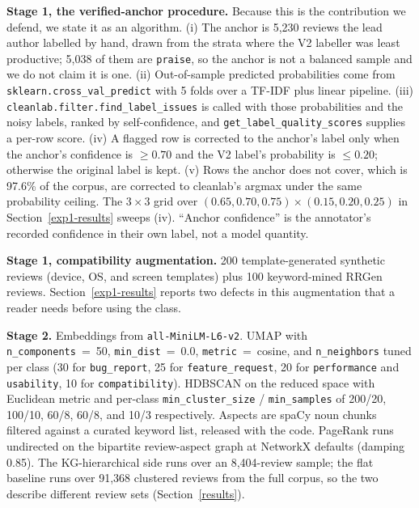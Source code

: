 \documentclass[preprint,12pt]{elsarticle}
\begin{document}
  \textbf{Stage 1, the verified-anchor procedure.} Because this is the contribution we defend, we
  state it as an algorithm. (i) The anchor is 5{,}230 reviews the lead author labelled by hand,
  drawn from the strata where the V2 labeller was least productive; 5{,}038 of them are
  \texttt{praise}, so the anchor is not a balanced sample and we do not claim it is one. (ii)
  Out-of-sample predicted probabilities come from \texttt{sklearn.cross\_val\_predict} with
  5 folds over a TF-IDF plus linear pipeline. (iii) \texttt{cleanlab.filter.find\_label\_issues}
  is called with those probabilities and the noisy labels, ranked by self-confidence, and
  \texttt{get\_label\_quality\_scores} supplies a per-row score. (iv) A flagged row is corrected to
  the anchor's label only when the anchor's confidence is $\geq 0.70$ and the V2 label's
  probability is $\leq 0.20$; otherwise the original label is kept. (v) Rows the anchor does not
  cover, which is 97.6\% of the corpus, are corrected to cleanlab's argmax under the same
  probability ceiling. The $3\times3$ grid over $(0.65, 0.70, 0.75) \times (0.15, 0.20, 0.25)$ in
  Section~\ref{exp1-results} sweeps (iv). ``Anchor confidence'' is the annotator's recorded
  confidence in their own label, not a model quantity.

  \textbf{Stage 1, compatibility augmentation.} 200 template-generated synthetic reviews (device,
  OS, and screen templates) plus 100 keyword-mined RRGen reviews. Section~\ref{exp1-results}
  reports two defects in this augmentation that a reader needs before using the class.

  \textbf{Stage 2.} Embeddings from \texttt{all-MiniLM-L6-v2}. UMAP with
  \texttt{n\_components}~=~50, \texttt{min\_dist}~=~0.0, \texttt{metric}~=~cosine, and
  \texttt{n\_neighbors} tuned per class (30 for \texttt{bug\_report}, 25 for
  \texttt{feature\_request}, 20 for \texttt{performance} and \texttt{usability}, 10 for
  \texttt{compatibility}). HDBSCAN on the reduced space with Euclidean metric and per-class
  \texttt{min\_cluster\_size} / \texttt{min\_samples} of 200/20, 100/10, 60/8, 60/8, and 10/3
  respectively. Aspects are spaCy noun chunks filtered against a curated keyword list, released
  with the code. PageRank runs undirected on the bipartite review-aspect graph at NetworkX
  defaults (damping 0.85). The KG-hierarchical side runs over an 8{,}404-review sample; the flat
  baseline runs over 91{,}368 clustered reviews from the full corpus, so the two describe
  different review sets (Section~\ref{results}).
\end{document}
